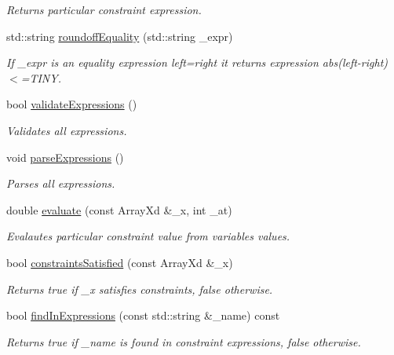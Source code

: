 \begin{DoxyCompactItemize}
\begin{DoxyCompactList}\small\item\em Returns particular constraint expression. \end{DoxyCompactList}\item 
std\-::string \hyperlink{class_go_s_u_m_1_1_c_constraints_ae1263ac8c72174dddef6496492c9d7ad}{roundoff\-Equality} (std\-::string \-\_\-expr)
\begin{DoxyCompactList}\small\item\em If \-\_\-expr is an equality expression left=right it returns expression abs(left-\/right)$<$=T\-I\-N\-Y. \end{DoxyCompactList}\item 
bool \hyperlink{class_go_s_u_m_1_1_c_constraints_ab27d71bea1ae044f44b172100b9dfbe7}{validate\-Expressions} ()
\begin{DoxyCompactList}\small\item\em Validates all expressions. \end{DoxyCompactList}\item 
void \hyperlink{class_go_s_u_m_1_1_c_constraints_af25eeb4dba5c0322be3fe4f0cdfbfdcd}{parse\-Expressions} ()
\begin{DoxyCompactList}\small\item\em Parses all expressions. \end{DoxyCompactList}\item 
double \hyperlink{class_go_s_u_m_1_1_c_constraints_ac1fe75127e58521d895cdc4d33396aa6}{evaluate} (const Array\-Xd \&\-\_\-x, int \-\_\-at)
\begin{DoxyCompactList}\small\item\em Evalautes particular constraint value from variables values. \end{DoxyCompactList}\item 
bool \hyperlink{class_go_s_u_m_1_1_c_constraints_a263ec572454111f605e6de9fad8348f0}{constraints\-Satisfied} (const Array\-Xd \&\-\_\-x)
\begin{DoxyCompactList}\small\item\em Returns true if \-\_\-x satisfies constraints, false otherwise. \end{DoxyCompactList}\item 
bool \hyperlink{class_go_s_u_m_1_1_c_constraints_ac58b8ce474e2651f3b64280efdb698fb}{find\-In\-Expressions} (const std\-::string \&\-\_\-name) const 
\begin{DoxyCompactList}\small\item\em Returns true if \-\_\-name is found in constraint expressions, false otherwise. \end{DoxyCompactList}\end{DoxyCompactItemize}
